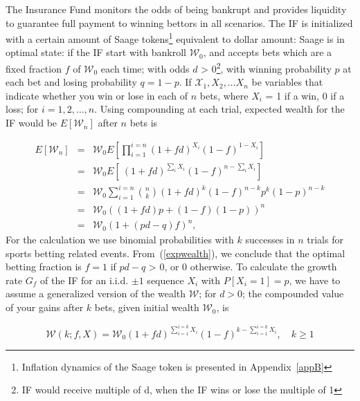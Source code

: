 \documentclass[%
 reprint,
 amsmath,amssymb,
 aps,
]{revtex4-2}
\begin{document}
The Insurance Fund monitors the odds of being bankrupt and provides liquidity to guarantee full payment to winning bettors in all scenarios. The IF is initialized with a certain amount of Saage tokens\footnote{Inflation dynamics of the Saage token is presented in Appendix~\ref{appB}} equivalent to dollar amount: 
Saage is in optimal state: if the IF start with bankroll $\mathcal{W}_0$, and accepts bets which are a fixed fraction $f$ of $\mathcal{W}_0$ each time; with odds $d$ > 0\footnote{IF would receive multiple of d, when the IF wins or lose the multiple of 1}, with winning probability $p$ at each bet and losing probability  $q = 1 - p$.
If $\mathcal{X}_1, X_2, … X_n$ be variables that indicate whether you win or lose in each of $n$ bets, where $X_i$ = 1 if a win, 0 if a loss; for $i = 1, 2, \ldots, n$. Using compounding at each trial, expected wealth for the IF would be $E[\mathcal{W}_n]$ after $n$ bets is 

\begin{eqnarray}
E[\mathcal{W}_n] &=& \mathcal{W}_0 E \left[ \prod_{i=1}^{i=n} (1 + f d)^{X_i} (1 - f)^{1 - X_i} \right] \ \nonumber\\
&=& \mathcal{W}_0 E [\ (1 + f d)^{\sum_i X_i} (1 - f)^{n - \sum_i X_i} ]\ \nonumber\\
&=& \mathcal{W}_0 \sum_{i=1}^{i=n} {n \choose k} (1 + f d)^ k (1 - f)^{n - k} p^k (1 - p)^{n-k} \nonumber\\
&=& \mathcal{W}_0 ((1 + f d)p + (1 - f)(1 - p))^n \nonumber\\
&=& \mathcal{W}_0 (1 + (pd - q)f)^n , 
\label{expwealth}
\end{eqnarray}
For the calculation we use binomial probabilities with $k$ successes in $n$ trials for sports betting related events. From~(\ref{expwealth}), we conclude that the optimal betting fraction is $f = 1$ if $pd - q$ > 0, or 0 otherwise. 
To calculate the growth rate $G_f$ of the IF for an i.i.d. $\pm1$ sequence $X_i$ with $P[X_i = 1] = p$, we have to assume a generalized version of the wealth $\mathcal{W}$; for $d >0$; the compounded value of your gains after $k$ bets, given initial wealth $\mathcal{W}_0$, is 

\begin{equation} 
\mathcal{W}(k; f, X) = \mathcal{W}_0(1 + f d)^{\sum_{i=1}^{i=k} X_i} (1 - f)^{k - \sum_{i=1}^{i=k} X_i}, \quad k \geq 1
\end{equation}
\end{document}
